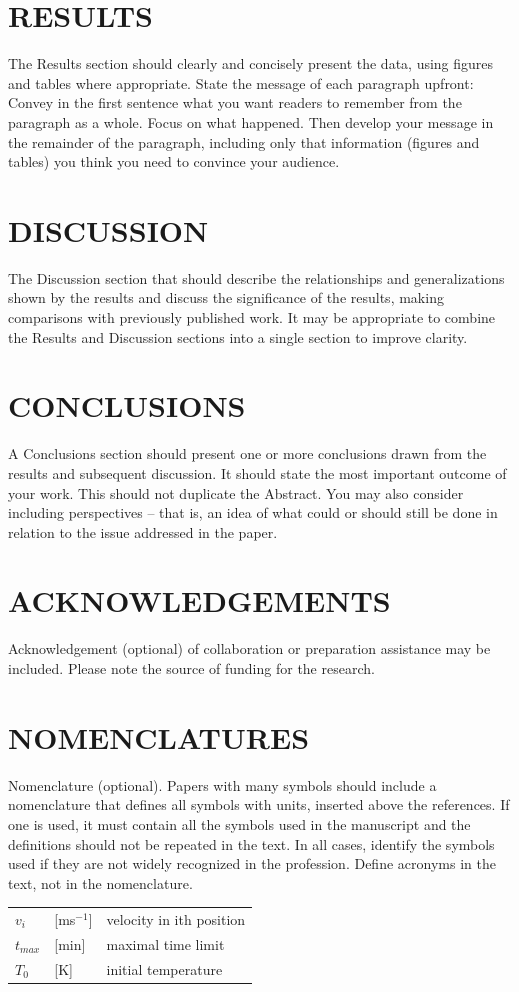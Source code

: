 \documentclass[10pt]{JoME}
\begin{document}
\section{RESULTS}

The Results section should clearly and concisely present the data, using figures and tables where appropriate. State the message of each paragraph upfront: Convey in the first sentence what you want readers to remember from the paragraph as a whole. Focus on what happened. Then develop your message in the remainder of the paragraph, including only that information (figures and tables) you think you need to convince your audience.

\section{DISCUSSION}

The Discussion section that should describe the relationships and generalizations shown by the results and discuss the significance of the results, making comparisons with previously published work. It may be appropriate to combine the Results and Discussion sections into a single section to improve clarity.

\section{CONCLUSIONS}

A Conclusions section should present one or more conclusions drawn from the results and subsequent discussion. It should state the most important outcome of your work. This should not duplicate the Abstract. You may also consider including perspectives -- that is, an idea of what could or should still be done in relation to the issue addressed in the paper.

\section{ACKNOWLEDGEMENTS}

Acknowledgement (optional) of collaboration or preparation assistance may be included. Please note the source of funding for the research.

\section{NOMENCLATURES}

Nomenclature (optional). Papers with many symbols should include a nomenclature that defines all symbols with units, inserted above the references. If one is used, it must contain all the symbols used in the manuscript and the definitions should not be repeated in the text. In all cases, identify the symbols used if they are not widely recognized in the profession. Define acronyms in the text, not in the nomenclature.\smallskip\\ 
\begin{tabular}{lll}
$v_i$	& [ms$^{-1}$] & velocity in ith position\\
$t_{max}$	& [min]  & maximal time limit\\
$T_0$	& [K]	& initial temperature
\end{tabular}
\end{document}
